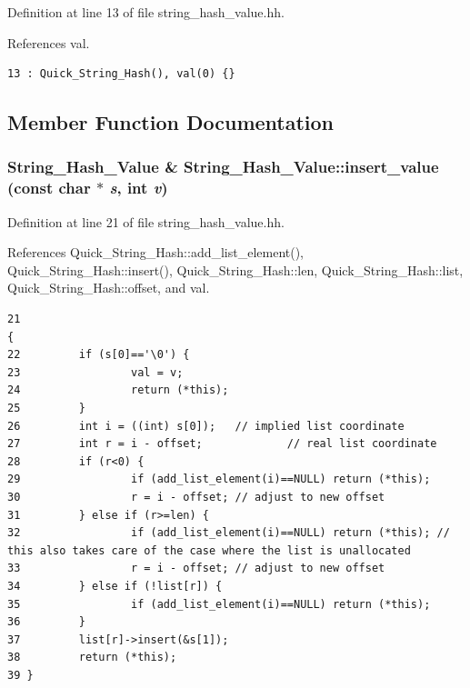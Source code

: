 Definition at line 13 of file string\_\-hash\_\-value.hh.

References val.



\footnotesize\begin{verbatim}13 : Quick_String_Hash(), val(0) {}
\end{verbatim}\normalsize 


\subsection{Member Function Documentation}
\subsubsection{\setlength{\rightskip}{0pt plus 5cm}String\_\-Hash\_\-Value \& String\_\-Hash\_\-Value::insert\_\-value (const char $\ast$ {\em s}, int {\em v})}\label{classString__Hash__Value_a1}




Definition at line 21 of file string\_\-hash\_\-value.hh.

References Quick\_\-String\_\-Hash::add\_\-list\_\-element(), Quick\_\-String\_\-Hash::insert(), Quick\_\-String\_\-Hash::len, Quick\_\-String\_\-Hash::list, Quick\_\-String\_\-Hash::offset, and val.



\footnotesize\begin{verbatim}21                                                                          {
22         if (s[0]=='\0') {
23                 val = v;
24                 return (*this);
25         }
26         int i = ((int) s[0]);   // implied list coordinate
27         int r = i - offset;             // real list coordinate
28         if (r<0) {
29                 if (add_list_element(i)==NULL) return (*this);
30                 r = i - offset; // adjust to new offset
31         } else if (r>=len) {
32                 if (add_list_element(i)==NULL) return (*this); // this also takes care of the case where the list is unallocated
33                 r = i - offset; // adjust to new offset
34         } else if (!list[r]) {
35                 if (add_list_element(i)==NULL) return (*this);
36         }
37         list[r]->insert(&s[1]);
38         return (*this);
39 }
\end{verbatim}\normalsize 
{}
